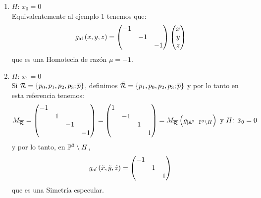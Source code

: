 \begin{example}
\begin{enumerate}
            \begin{enumerate}
                \item $H$: $x_0=0$\\
                Equivalentemente al ejemplo 1 tenemos que:
                \[
                g_\text{af}\left( x,y,z \right) =
                \begin{pmatrix}
                -1 & &\\
                & -1 &\\
                & & -1\\
                \end{pmatrix}
                \begin{pmatrix}
                x\\
                y\\
                z\\
                \end{pmatrix}
                \]
                que es una Homotecia de razón $\mu = -1$. 
                \item $H$: $x_1=0$\\
                 Si $\mathcal{R} = \{p_0, p_1, p_2, p_3; \overline{p} \}$, definimos $\tilde{\mathcal{R}}=\{p_1, p_0, p_2, p_3; \overline{p} \}$ y por lo tanto en esta referencia tenemos:
                 \[
                    M_{\overline{\mathcal{R}}} =
                    \begin{pmatrix}
                    -1 & & &\\
                    & 1 & &\\
                    & & -1 &\\
                    & & & -1\\
                    \end{pmatrix} =
                    \begin{pmatrix}
                    1 & & &\\
                    & -1 & &\\
                    & & 1 &\\
                    & & & 1\\
                    \end{pmatrix} = M_{\overline{\mathcal{R}}} \left( g_{|\mathbb{A}^3 = \mathbb{P}^3\setminus H}\right)
                    \text{ y }
                    H\text{: }\tilde{x}_0 = 0
                \]
                y por lo tanto, en $\mathbb{P}^3\setminus H$,
                \[
                g_\text{af} \left( \tilde{x},\tilde{y},\tilde{z} \right) =
                \begin{pmatrix}
                    -1 & &\\
                    & 1 &\\
                    & & 1\\
                \end{pmatrix}
                \]
                que es una Simetría especular.
            \end{enumerate}
        \end{enumerate}
    \end{example}
    